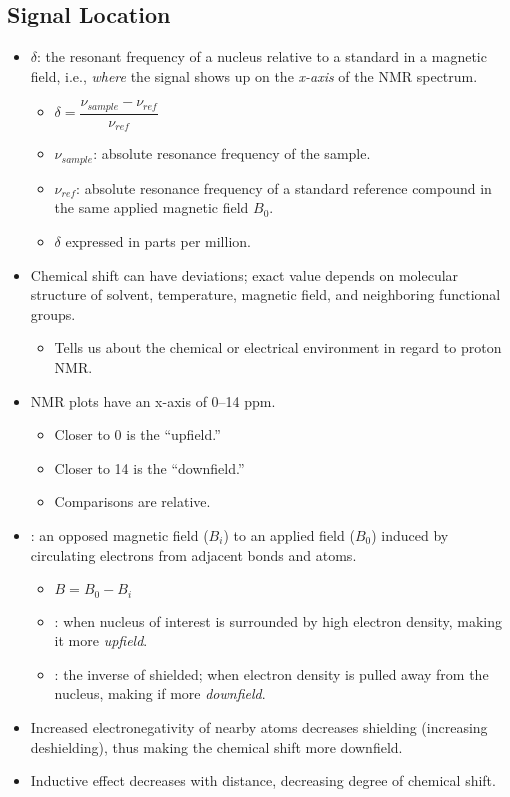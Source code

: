 \begin{itemize}
    \subsection{Signal Location}\label{Chemical Shifts}
    \begin{itemize}
        \item {} \(\delta \): the resonant frequency of a nucleus relative to a standard in a magnetic field, i.e., \emph{where} the signal shows up on the \emph{x-axis} of the NMR spectrum.
          \begin{itemize}
            \item \(\delta = \dfrac{\nu_{sample}-\nu_{ref}}{\nu_{ref}}\)
            \item \(\nu_{sample}\): absolute resonance frequency of the sample.
            \item \(\nu_{ref} \): absolute resonance frequency of a standard reference compound in the same applied magnetic field \(B_0\).
            \item \(\delta \) expressed in parts per million.
          \end{itemize}
        \item Chemical shift can have deviations; exact value depends on molecular structure of solvent, temperature, magnetic field, and neighboring functional groups.
          \begin{itemize}
            \item Tells us about the chemical or electrical environment in regard to proton NMR\@.
          \end{itemize}
        \item NMR plots have an x-axis of 0--14 ppm.
          \begin{itemize}
            \item Closer to 0 is the ``upfield.''
            \item Closer to 14 is the  ``downfield.''
            \item Comparisons are relative. 
          \end{itemize}
        \item {}: an opposed magnetic field (\(B_i\)) to an applied field (\(B_0\)) induced by circulating electrons from adjacent bonds and atoms. 
          \begin{itemize}
            \item \(B = B_0 - B_i\)
            \item {}: when nucleus of interest is surrounded by high electron density, making it more \emph{upfield}.
            \item {}: the inverse of shielded; when electron density is pulled away from the nucleus, making if more \emph{downfield}. 
          \end{itemize}
        \item Increased electronegativity of nearby atoms decreases shielding (increasing deshielding), thus making the chemical shift more downfield.
        \item Inductive effect decreases with distance, decreasing degree of chemical shift.
    \end{itemize}
    

\end{itemize}
